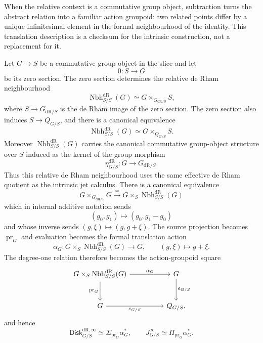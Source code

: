 When the relative context is a commutative group object, subtraction turns the
abstract relation into a familiar action groupoid: two related points differ
by a unique infinitesimal element in the formal neighbourhood of the identity.
This translation description is a checksum for the intrinsic construction,
not a replacement for it.
\begin{proposition}
Let \(G\to S\) be a commutative group object in the slice and let
\[
  0:S\to G
\]
be its zero section. The zero section determines the relative de Rham neighbourhood
\[
  \operatorname{Nbh}^{\mathrm{dR}}_{S/S}(G)
  \simeq
  G\times_{G_{\mathrm{dR}/S}}S,
\]
where \(S\to G_{\mathrm{dR}/S}\) is the de Rham image of the zero section.
The zero section also induces \(S\to Q_{G/S}\), and there is a canonical
equivalence
\[
  \operatorname{Nbh}^{\mathrm{dR}}_{S/S}(G)
  \simeq
  G\times_{Q_{G/S}}S.
\]
Moreover \(\operatorname{Nbh}^{\mathrm{dR}}_{S/S}(G)\) carries the canonical commutative group-object structure over
\(S\) induced as the kernel of the group morphism
\[
  \eta_{G/S}^{\mathrm{dR}}:G\to G_{\mathrm{dR}/S}.
\]
Thus this relative de Rham neighbourhood uses the same effective de Rham quotient
as the intrinsic jet calculus. There is a canonical equivalence
\[
  G\times_{G_{\mathrm{dR}/S}}G
  \xrightarrow{\simeq}
  G\times_S\operatorname{Nbh}^{\mathrm{dR}}_{S/S}(G)
\]
which in internal additive notation sends
\[
  (g_0,g_1)\longmapsto(g_0,g_1-g_0)
\]
and whose inverse sends \((g,\xi)\mapsto(g,g+\xi)\). The source projection becomes
\(\operatorname{pr}_G\) and evaluation becomes the formal translation action
\[
  \alpha_G:G\times_S\operatorname{Nbh}^{\mathrm{dR}}_{S/S}(G)\to G,
  \qquad
  (g,\xi)\mapsto g+\xi.
\]
The degree-one relation therefore becomes the action-groupoid square
\[
\begin{tikzcd}[column sep=huge,row sep=large]
G\times_S\operatorname{Nbh}^{\mathrm{dR}}_{S/S}(G)
  \ar[r,"\alpha_G"]
  \ar[d,"\operatorname{pr}_G"']
&
G \ar[d,"e_{G/S}"]\\
G \ar[r,"e_{G/S}"']
&
Q_{G/S},
\end{tikzcd}
\]
and hence
\[
  \mathsf{Disk}^{\mathrm{dR},\infty}_{G/S}
  \simeq
  \Sigma_{\operatorname{pr}_G}\alpha_G^*,
  \qquad
  J^\infty_{G/S}
  \simeq
  \Pi_{\operatorname{pr}_G}\alpha_G^*.
\]
\end{proposition}

